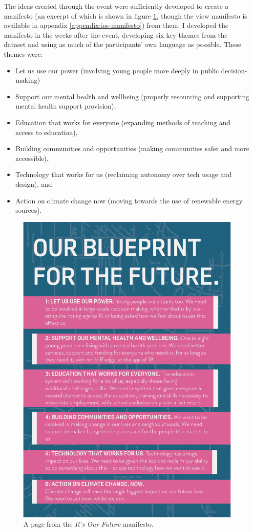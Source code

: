 The ideas created through the event were sufficiently developed to create a manifesto (an excerpt of which is shown in figure \ref{fig:iof-manifesto}, though the view manifesto is available in appendix \ref{appendix:ios-manifesto}) from them. I developed the manifesto in the weeks after the event, developing six key themes from the dataset and using as much of the participants' own language as possible. These themes were:
\begin{itemize}
    \item Let us use our power (involving young people more deeply in public decision-making)
    \item Support our mental health and wellbeing (properly resourcing and supporting mental health support provision),
    \item Education that works for everyone (expanding methods of teaching and access to education),
    \item Building communities and opportunities (making communities safer and more accessible),
    \item Technology that works for us (reclaiming autonomy over tech usage and design), and
    \item Action on climate change now (moving towards the use of renewable energy sources).
    \end{itemize}
\begin{figure}
    \centering
    \includegraphics[width=1\linewidth]{Images/7/iof-manifesto.png}
    \caption{A page from the \textit{It's Our Future} manifesto.}
    \label{fig:iof-manifesto}
\end{figure}
